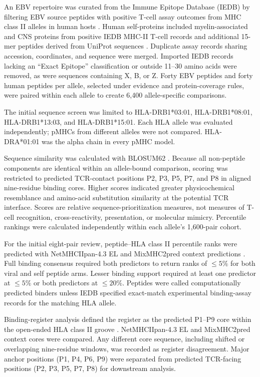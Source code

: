\documentclass[11pt]{article}
\begin{document}
An EBV repertoire was curated from the Immune Epitope Database (IEDB) by filtering EBV source peptides with positive T-cell assay outcomes from MHC class II alleles in human hosts \cite{iedb}. Human self-proteins included myelin-associated and CNS proteins from positive IEDB MHC-II T-cell records and additional 15-mer peptides derived from UniProt sequences \cite{uniprot}. Duplicate assay records sharing accession, coordinates, and sequence were merged. Imported IEDB records lacking an ``Exact Epitope'' classification or outside 11--30 amino acids were removed, as were sequences containing X, B, or Z. Forty EBV peptides and forty human peptides per allele, selected under evidence and protein-coverage rules, were paired within each allele to create 6,400 allele-specific comparisons.

The initial sequence screen was limited to HLA-DRB1*03:01, HLA-DRB1*08:01, HLA-DRB1*13:03, and HLA-DRB1*15:01. Each HLA allele was evaluated independently; pMHCs from different alleles were not compared. HLA-DRA*01:01 was the alpha chain in every pMHC model.

Sequence similarity was calculated with BLOSUM62 \cite{blosum}. Because all non-peptide components are identical within an allele-bound comparison, scoring was restricted to predicted TCR-contact positions P2, P3, P5, P7, and P8 in aligned nine-residue binding cores. Higher scores indicated greater physicochemical resemblance and amino-acid substitution similarity at the potential TCR interface. Scores are relative sequence-prioritization measures, not measures of T-cell recognition, cross-reactivity, presentation, or molecular mimicry. Percentile rankings were calculated independently within each allele's 1,600-pair cohort.

For the initial eight-pair review, peptide--HLA class II percentile ranks were predicted with NetMHCIIpan-4.3 EL and MixMHC2pred context predictions \cite{netmhc,mix2019}. Full binding consensus required both predictors to return ranks of $\leq5\%$ for both viral and self peptide arms. Lesser binding support required at least one predictor at $\leq5\%$ or both predictors at $\leq20\%$. Peptides were called computationally predicted binders unless IEDB specified exact-match experimental binding-assay records for the matching HLA allele.

Binding-register analysis defined the register as the predicted P1--P9 core within the open-ended HLA class II groove \cite{brown}. NetMHCIIpan-4.3 EL and MixMHC2pred context cores were compared. Any different core sequence, including shifted or overlapping nine-residue windows, was recorded as register disagreement. Major anchor positions (P1, P4, P6, P9) were separated from predicted TCR-facing positions (P2, P3, P5, P7, P8) for downstream analysis.
\end{document}
